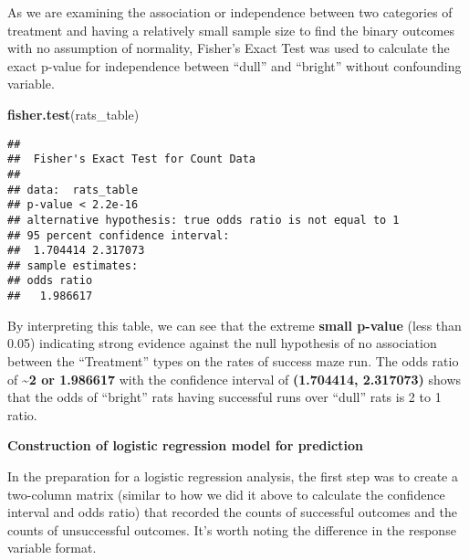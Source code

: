 \documentclass[
]{article}
\newenvironment{Shaded}{\begin{snugshade}}{\end{snugshade}}
\newcommand{\CommentTok}[1]{\textcolor[rgb]{0.56,0.35,0.01}{\textit{#1}}}
\newcommand{\DecValTok}[1]{\textcolor[rgb]{0.00,0.00,0.81}{#1}}
\newcommand{\FunctionTok}[1]{\textcolor[rgb]{0.13,0.29,0.53}{\textbf{#1}}}
\newcommand{\NormalTok}[1]{#1}
\newcommand{\OtherTok}[1]{\textcolor[rgb]{0.56,0.35,0.01}{#1}}
\newcommand{\SpecialCharTok}[1]{\textcolor[rgb]{0.81,0.36,0.00}{\textbf{#1}}}
\begin{document}
As we are examining the association or independence between two
categories of treatment and having a relatively small sample size to
find the binary outcomes with no assumption of normality, Fisher's Exact
Test was used to calculate the exact p-value for independence between
``dull'' and ``bright'' without confounding variable.

\begin{Shaded}
\begin{Highlighting}[]
\FunctionTok{fisher.test}\NormalTok{(rats\_table)}
\end{Highlighting}
\end{Shaded}

\begin{verbatim}
## 
##  Fisher's Exact Test for Count Data
## 
## data:  rats_table
## p-value < 2.2e-16
## alternative hypothesis: true odds ratio is not equal to 1
## 95 percent confidence interval:
##  1.704414 2.317073
## sample estimates:
## odds ratio 
##   1.986617
\end{verbatim}

By interpreting this table, we can see that the extreme \textbf{small
p-value} (less than 0.05) indicating strong evidence against the null
hypothesis of no association between the ``Treatment'' types on the
rates of success maze run. The odds ratio of \textbf{\textasciitilde2 or
1.986617} with the confidence interval of \textbf{(1.704414, 2.317073)}
shows that the odds of ``bright'' rats having successful runs over
``dull'' rats is 2 to 1 ratio.

\textbf{Construction of logistic regression model for prediction}

In the preparation for a logistic regression analysis, the first step
was to create a two-column matrix (similar to how we did it above to
calculate the confidence interval and odds ratio) that recorded the
counts of successful outcomes and the counts of unsuccessful outcomes.
It's worth noting the difference in the response variable format.

\begin{Shaded}
\end{Shaded}
\end{document}
